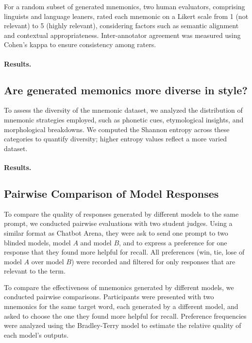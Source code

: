 \documentclass{article}
\newcounter{para}
\begin{document}
For a random subset of generated mnemonics, two human evaluators, comprising linguists and language leaners, rated each mnemonic on a Likert scale from 1 (not relevant) to 5 (highly relevant), considering factors such as semantic alignment and contextual appropriateness. Inter-annotator agreement was measured using Cohen's kappa to ensure consistency among raters.

\paragraph{Results.}

\subsection{Are generated memonics more diverse in style?} \label{sec:diverse-style}

To assess the diversity of the mnemonic dataset, we analyzed the distribution of mnemonic strategies employed, such as phonetic cues, etymological insights, and morphological breakdowns. We computed the Shannon entropy across these categories to quantify diversity; higher entropy values reflect a more varied dataset.

\paragraph{Results.}

\subsection{Pairwise Comparison of Model Responses} \label{sec:model-comparison}


To compare the quality of responses generated by different models to the same prompt, we conducted pairwise evaluations with two student judges. Using a similar format as Chatbot Arena, they were ask to send one prompt to two blinded models, model $A$ and model $B$, and to express a preference for one response that they found more helpful for recall. All preferences (win, tie, lose of model $A$ over model $B$) were recorded and filtered for only responses that are relevant to the term.

To compare the effectiveness of mnemonics generated by different models, we conducted pairwise comparisons. Participants were presented with two mnemonics for the same target word, each generated by a different model, and asked to choose the one they found more helpful for recall. Preference frequencies were analyzed using the Bradley-Terry model to estimate the relative quality of each model's outputs.
\end{document}
